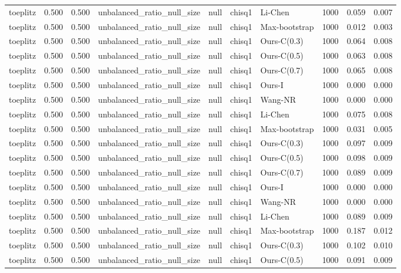 \begin{tabular}{lrrllllrrr}
toeplitz & 0.500 & 0.500 & unbalanced\_ratio\_null\_size & null & chisq1 & Li-Chen & 1000 & 0.059 & 0.007 \\
toeplitz & 0.500 & 0.500 & unbalanced\_ratio\_null\_size & null & chisq1 & Max-bootstrap & 1000 & 0.012 & 0.003 \\
toeplitz & 0.500 & 0.500 & unbalanced\_ratio\_null\_size & null & chisq1 & Ours-C(0.3) & 1000 & 0.064 & 0.008 \\
toeplitz & 0.500 & 0.500 & unbalanced\_ratio\_null\_size & null & chisq1 & Ours-C(0.5) & 1000 & 0.063 & 0.008 \\
toeplitz & 0.500 & 0.500 & unbalanced\_ratio\_null\_size & null & chisq1 & Ours-C(0.7) & 1000 & 0.065 & 0.008 \\
toeplitz & 0.500 & 0.500 & unbalanced\_ratio\_null\_size & null & chisq1 & Ours-I & 1000 & 0.000 & 0.000 \\
toeplitz & 0.500 & 0.500 & unbalanced\_ratio\_null\_size & null & chisq1 & Wang-NR & 1000 & 0.000 & 0.000 \\
toeplitz & 0.500 & 0.500 & unbalanced\_ratio\_null\_size & null & chisq1 & Li-Chen & 1000 & 0.075 & 0.008 \\
toeplitz & 0.500 & 0.500 & unbalanced\_ratio\_null\_size & null & chisq1 & Max-bootstrap & 1000 & 0.031 & 0.005 \\
toeplitz & 0.500 & 0.500 & unbalanced\_ratio\_null\_size & null & chisq1 & Ours-C(0.3) & 1000 & 0.097 & 0.009 \\
toeplitz & 0.500 & 0.500 & unbalanced\_ratio\_null\_size & null & chisq1 & Ours-C(0.5) & 1000 & 0.098 & 0.009 \\
toeplitz & 0.500 & 0.500 & unbalanced\_ratio\_null\_size & null & chisq1 & Ours-C(0.7) & 1000 & 0.089 & 0.009 \\
toeplitz & 0.500 & 0.500 & unbalanced\_ratio\_null\_size & null & chisq1 & Ours-I & 1000 & 0.000 & 0.000 \\
toeplitz & 0.500 & 0.500 & unbalanced\_ratio\_null\_size & null & chisq1 & Wang-NR & 1000 & 0.000 & 0.000 \\
toeplitz & 0.500 & 0.500 & unbalanced\_ratio\_null\_size & null & chisq1 & Li-Chen & 1000 & 0.089 & 0.009 \\
toeplitz & 0.500 & 0.500 & unbalanced\_ratio\_null\_size & null & chisq1 & Max-bootstrap & 1000 & 0.187 & 0.012 \\
toeplitz & 0.500 & 0.500 & unbalanced\_ratio\_null\_size & null & chisq1 & Ours-C(0.3) & 1000 & 0.102 & 0.010 \\
toeplitz & 0.500 & 0.500 & unbalanced\_ratio\_null\_size & null & chisq1 & Ours-C(0.5) & 1000 & 0.091 & 0.009 \\

\end{tabular}
